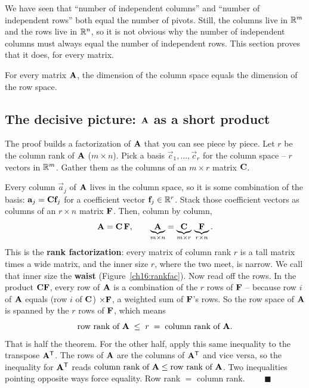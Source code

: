 We have seen that ``number of independent columns'' and ``number of independent
rows'' both equal the number of pivots. Still, the columns live in $\mathbb{R}^m$ and
the rows live in $\mathbb{R}^n$, so it is not obvious why the number of independent
columns must always equal the number of independent rows. This section proves
that it does, for every matrix.

\begin{theorem}[Row rank $=$ Column rank]\label{ch16:row-col}
For every matrix $\mathbf{A}$, the dimension of the column space equals the dimension
of the row space.
\end{theorem}

\subsection{The decisive picture: $\mathbf{A}$ as a short product}

The proof builds a factorization of $\mathbf{A}$ that you can see piece by piece.
Let $r$ be the column rank of $\mathbf{A}$ ($m\times n$). Pick a
basis $\vec{c}_1,\dots,\vec{c}_r$ for the column space -- $r$ vectors in $\mathbb{R}^m$.
Gather them as the columns of an $m \times r$ matrix $\mathbf{C}$.

Every column $\vec{a}_j$ of $\mathbf{A}$ lives in the column space, so it is some
combination of the basis: $\mathbf{a}_j = \mathbf{C}\mathbf{f}_j$ for a coefficient vector
$\mathbf{f}_j \in \mathbb{R}^r$. Stack those coefficient vectors as columns of an $r\times n$
matrix $\mathbf{F}$. Then, column by column,
\[
  \mathbf{A} = \mathbf{C}\,\mathbf{F}, \qquad
  \underbrace{\mathbf{A}}_{m\times n} =
  \underbrace{\mathbf{C}}_{m\times r}\,
  \underbrace{\mathbf{F}}_{r\times n}.
\]
This is the \textbf{rank factorization}: every matrix of column rank $r$ is a
tall matrix times a wide matrix, and the inner size $r$, where the two meet, is
narrow. We call that inner size the \textbf{waist}
(Figure~\ref{ch16:rankfac}). Now read off the rows. In the product $\mathbf{C}\mathbf{F}$, every
row of $\mathbf{A}$ is a combination of the $r$ rows of $\mathbf{F}$ -- because row $i$
of $\mathbf{A}$ equals (row $i$ of $\mathbf{C}$) $\times \mathbf{F}$, a weighted sum of
$\mathbf{F}$'s rows. So the row space of $\mathbf{A}$ is spanned by the $r$ rows of
$\mathbf{F}$, which means
\[
  \text{row rank of } \mathbf{A} \;\le\; r \;=\; \text{column rank of } \mathbf{A}.
\]
That is half the theorem. For the other half, apply this same inequality to the
transpose $\mathbf{A}^{\mathsf{T}}$. The rows of $\mathbf{A}$ are the columns of $\mathbf{A}^{\mathsf{T}}$ and
vice versa, so the inequality for $\mathbf{A}^{\mathsf{T}}$ reads
$\text{column rank of }\mathbf{A} \le \text{row rank of }\mathbf{A}$. Two inequalities
pointing opposite ways force equality. Row rank $=$ column rank. $\qquad\blacksquare$

